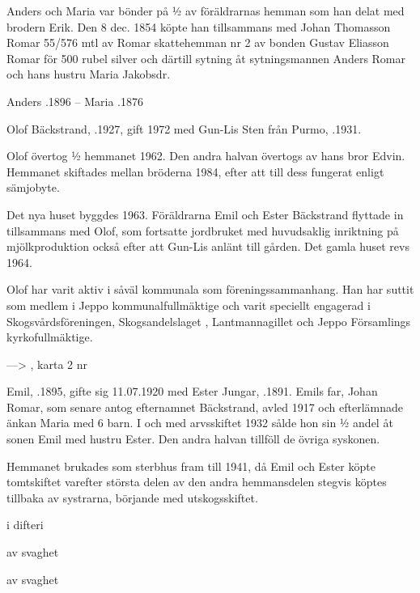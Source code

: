 Anders och Maria var bönder på ½  av föräldrarnas hemman som han delat med brodern Erik. Den 8 dec. 1854 köpte han tillsammans med Johan Thomasson Romar 55/576 mtl av Romar skattehemman nr 2 av bonden Gustav Eliasson Romar för 500 rubel silver och därtill sytning åt sytningsmannen Anders Romar och hans hustru Maria Jakobsdr.

Anders .1896  --  Maria  .1876






Olof Bäckstrand, .1927, gift 1972 med Gun-Lis Sten från Purmo, .1931.

Olof övertog  ½ hemmanet 1962. Den andra  halvan övertogs av hans bror Edvin. Hemmanet skiftades mellan bröderna 1984, efter att till dess fungerat enligt sämjobyte.

Det nya huset byggdes 1963. Föräldrarna Emil och Ester Bäckstrand flyttade in tillsammans med Olof, som fortsatte jordbruket med huvudsaklig inriktning på mjölkproduktion också efter att Gun-Lis anlänt till gården. Det gamla huset revs 1964.

Olof har varit aktiv i såväl kommunala som föreningssammanhang. Han har suttit som medlem i Jeppo kommunalfullmäktige och varit speciellt engagerad i Skogsvårdsföreningen, Skogsandelslaget , Lantmannagillet och Jeppo Församlings kyrkofullmäktige.

---> , karta 2 nr 



Emil, .1895, gifte sig 11.07.1920 med Ester Jungar, .1891. Emils far, Johan Romar, som senare antog efternamnet Bäckstrand, avled 1917 och efterlämnade änkan Maria med 6 barn. I och med arvsskiftet 1932 sålde hon sin ½ andel åt sonen Emil  med hustru Ester. Den andra halvan tillföll de övriga syskonen.

Hemmanet brukades som sterbhus fram till 1941, då Emil och Ester köpte tomtskiftet varefter största delen av den andra hemmansdelen stegvis köptes tillbaka av systrarna, börjande med utskogsskiftet.
\begin{jhchildren}
  \item {}
  \item {} i difteri
  \item {}
  \item {}
  \item {} av svaghet
  \item {} av svaghet
\end{jhchildren}

